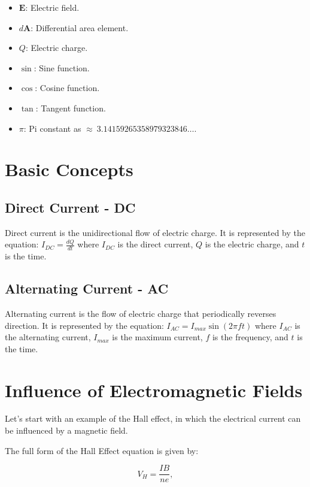 \documentclass[10pt]{article}
\begin{document}
\begin{itemize}
		\item {$\mathbf{E}$: Electric field.}

		\item {$d\mathbf{A}$: Differential area element.}

		\item {$Q$: Electric charge.}

		\item {$\sin$: Sine function.}

		\item {$\cos$: Cosine function.}

		\item {$\tan$: Tangent function.}

		\item {$\pi$: Pi constant as $\approx \ 3.14159265358979323846 \dots$.}
	\end{itemize}

	\section{Basic Concepts}
	\subsection{Direct Current - DC}
	Direct current is the unidirectional flow of electric charge. It is
	represented by the equation: $I_{DC}= \frac{dQ}{dt}$ where $I_{DC}$ is the direct
	current, $Q$ is the electric charge, and $t$ is the time.

	\subsection{Alternating Current - AC}
	Alternating current is the flow of electric charge that periodically reverses direction.
	It is represented by the equation: $I_{AC}= I_{max}\sin(2\pi f t)$ where $I_{AC}$
	is the alternating current, $I_{max}$ is the maximum current, $f$ is the frequency,
	and $t$ is the time.

	\section{Influence of Electromagnetic Fields}

	Let's start with an example of the Hall effect, in which the electrical
	current can be influenced by a magnetic field.

	The full form of the Hall Effect equation is given by:

	\begin{equation}
		V_{H} = \frac{IB}{ne},
	\end{equation}
\end{document}
